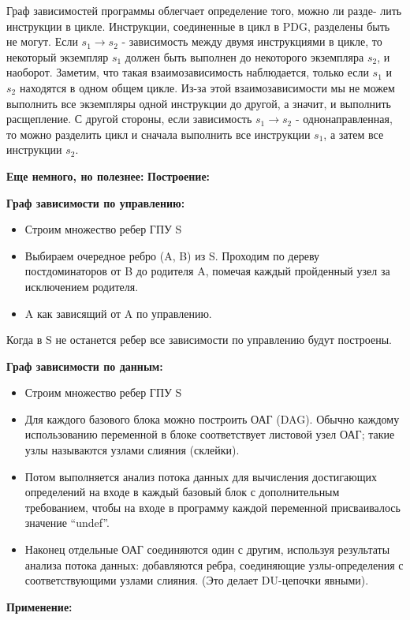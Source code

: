 Граф зависимостей программы облегчает определение того, можно ли разде- лить инструкции в цикле. Инструкции, соединенные в цикл в PDG, разделены быть не могут. Если $s_{1} \to s_{2}$ - зависимость между двумя инструкциями в цикле, то некоторый экземпляр $s_{1}$ должен быть выполнен до некоторого экземпляра $s_{2}$, и наоборот. Заметим, что такая взаимозависимость наблюдается, только если $s_{1}$ и $s_{2}$ находятся в одном общем цикле. Из-за этой взаимозависимости мы не можем выполнить все экземпляры одной инструкции до другой, а значит, и выполнить расщепление. С другой стороны, если зависимость $s_{1} \to s_{2}$ - однонаправленная, то можно разделить цикл и сначала выполнить все инструкции $s_{1}$, а затем все инструкции $s_{2}$.

\textbf{Еще немного, но полезнее:}
\textbf{Построение:}

\textbf{Граф зависимости по управлению:}
\begin{itemize}
\item Строим множество ребер ГПУ S
\item Выбираем очередное ребро (A, B) из S. Проходим по дереву постдоминаторов от B до родителя A, помечая каждый пройденный узел за исключением родителя.
\item A как зависящий от A по управлению.
\end{itemize}
Когда в S не останется ребер все зависимости по управлению будут
построены.

\textbf{Граф зависимости по данным:}
\begin{itemize}
    \item Строим множество ребер ГПУ S
    \item Для каждого базового блока можно построить ОАГ (DAG). Обычно каждому использованию переменной в блоке соответствует листовой узел ОАГ; такие узлы называются узлами слияния (склейки).
    \item Потом выполняется анализ потока данных для вычисления достигающих определений на входе в каждый базовый блок с дополнительным требованием, чтобы на входе в программу каждой переменной присваивалось значение “undef”.
    \item Наконец отдельные ОАГ соединяются один с другим, используя результаты анализа потока данных: добавляются ребра, соединяющие узлы-определения с соответствующими узлами
слияния. (Это делает DU-цепочки явными).
\end{itemize}


\textbf{Применение:}

